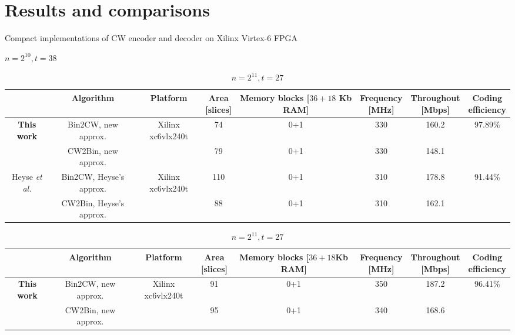 \documentclass[10pt,journal,compsoc]{IEEEtran}
\begin{document}
\section{Results and comparisons}
\begin{table}[!htb]\centering
    \caption{Compact implementations of CW encoder and decoder on Xilinx Virtex-6 FPGA}\label{tab:result}
\begin{subtable}[t]{0.95\linewidth}\centering
    \caption{$n=2^{10}, t=38$}
    \begin{tabular}{cccccccc}\hline
    &   Algorithm & Platform & \tabincell{c}{Area\\{}[slices]} &\tabincell{c}{Memory blocks\\{}[$36+18$ Kb RAM]} & \tabincell{c}{Frequency\\{}[MHz]} & \tabincell{c}{Throughout\\{}[Mbps]} & \tabincell{c}{Coding\\efficiency}\\
    \hline
    \multirow{2}{*}{\textbf{This work}} & Bin2CW, new approx. & \multirow{2}{*}{Xilinx xc6vlx240t} & 74 & 0+1 & 330  & 160.2 &\multirow{2}{*}{97.89\%}\\
                                        & CW2Bin, new approx. & & 79 & 0+1 & 330 & 148.1 & \\
    \hline
    \multirow{2}{*}{Heyse \textit{et al.}\cite{heyse2012towards}} & Bin2CW, Heyse's approx. & \multirow{2}{*}{Xilinx xc6vlx240t} & 110 & 0+1 & 310  &178.8 & \multirow{2}{*}{91.44\%}\\
                                        & CW2Bin, Heyse's approx. & & 88 & 0+1 & 310 & 162.1&  \\

    \hline
    \end{tabular}
\end{subtable}
\vspace{1.5em}

\begin{minipage}{\textwidth}\centering
\begin{subtable}[t]{0.95\linewidth}\centering
    \caption{$n=2^{11}, t=27$}
    \begin{tabular}{cccccccc}\hline
        &   Algorithm & Platform & \tabincell{c}{Area\\{}[slices]} & \tabincell{c}{Memory blocks\\{}[$36+18$Kb RAM]} & \tabincell{c}{Frequency\\{}[MHz]} & \tabincell{c}{Throughout\\{}[Mbps]}& \tabincell{c}{Coding\\efficiency}\\
    \hline
    \multirow{2}{*}{\textbf{This work}} & Bin2CW, new approx. & \multirow{2}{*}{Xilinx xc6vlx240t} & 91 & 0+1 & 350 & 187.2 &\multirow{2}{*}{96.41\%}\\
                                        & CW2Bin, new approx. &  & 95 & 0+1 & 340 & 168.6&\\


\end{tabular}
\end{subtable}
\end{minipage}
\end{table}
\end{document}
